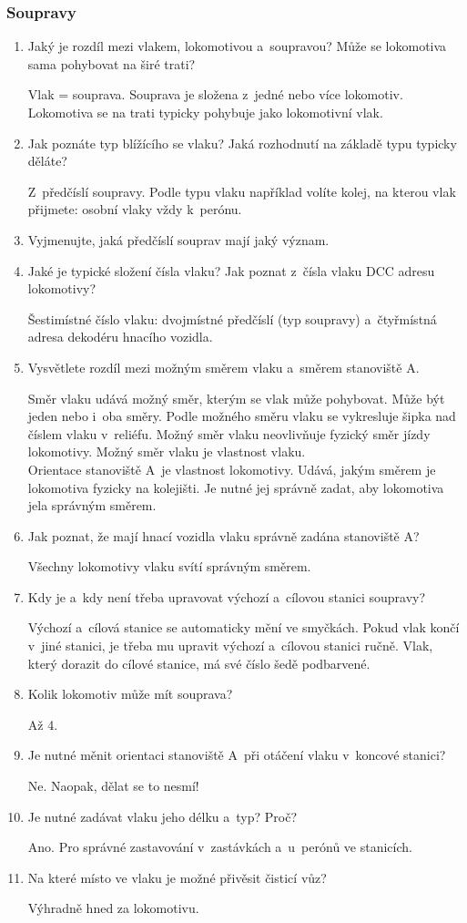 \documentclass[12pt,a4paper]{article}
\def\solution#1{\ifsolution \par{\color{gray}#1}\fi}
\begin{document}
\subsubsection*{Soupravy}
\begin{enumerate}[leftmargin=*]
\item Jaký je rozdíl mezi vlakem, lokomotivou a~soupravou? Může se lokomotiva
sama pohybovat na širé trati?
\solution{Vlak = souprava. Souprava je složena z~jedné nebo více lokomotiv.
Lokomotiva se na trati typicky pohybuje jako lokomotivní vlak.}

\item Jak poznáte typ blížícího se vlaku? Jaká rozhodnutí na základě typu
typicky děláte?
\solution{Z~předčíslí soupravy. Podle typu vlaku například volíte kolej, na
kterou vlak přijmete: osobní vlaky vždy k~perónu.}

\item Vyjmenujte, jaká předčíslí souprav mají jaký význam.

\item Jaké je typické složení čísla vlaku? Jak poznat z~čísla vlaku DCC adresu
lokomotivy?
\solution{Šestimístné číslo vlaku: dvojmístné předčíslí (typ soupravy)
a~čtyřmístná adresa dekodéru hnacího vozidla.}

\item Vysvětlete rozdíl mezi možným směrem vlaku a~směrem stanoviště A.
\solution{Směr vlaku udává možný směr, kterým se vlak může pohybovat. Může být
jeden nebo i~oba směry. Podle možného směru vlaku se vykresluje šipka nad
číslem vlaku v~reliéfu. Možný směr vlaku neovlivňuje fyzický směr jízdy
lokomotivy. Možný směr vlaku je vlastnost vlaku. \\ Orientace stanoviště A~je
vlastnost lokomotivy. Udává, jakým směrem je lokomotiva fyzicky na kolejišti.
Je nutné jej správně zadat, aby lokomotiva jela správným směrem.}

\item Jak poznat, že mají hnací vozidla vlaku správně zadána stanoviště A?
\solution{Všechny lokomotivy vlaku svítí správným směrem.}

\item Kdy je a~kdy není třeba upravovat výchozí a~cílovou stanici soupravy?
\solution{Výchozí a~cílová stanice se automaticky mění ve smyčkách. Pokud vlak
končí v~jiné stanici, je třeba mu upravit výchozí a~cílovou stanici ručně.
Vlak, který dorazit do cílové stanice, má své číslo šedě podbarvené.}

\item Kolik lokomotiv může mít souprava?
\solution{Až 4.}

\item Je nutné měnit orientaci stanoviště A~při otáčení vlaku v~koncové
stanici?
\solution{Ne. Naopak, dělat se to nesmí!}

\item Je nutné zadávat vlaku jeho délku a~typ? Proč?
\solution{Ano. Pro správné zastavování v~zastávkách a~u~perónů ve stanicích.}

\item Na které místo ve vlaku je možné přivěsit čisticí vůz?
\solution{Výhradně hned za lokomotivu.}

\end{enumerate}
\end{document}
